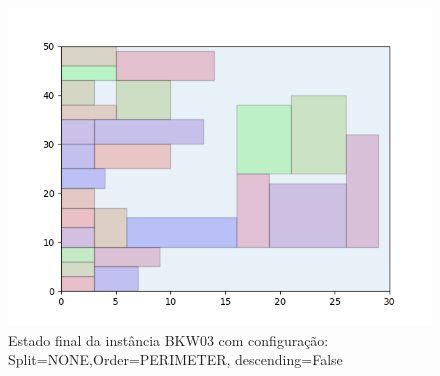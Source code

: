 \begin{figure}[H]
    \centering
    \caption[]{Estado final da instância BKW03 com configuração: Split=NONE,Order=PERIMETER, descending=False}
    \label{fig:bkw03-none-perimeter-false}
    \includegraphics[scale=0.5]{output/figures/bkw/bkw03/none/perimeter/false/00}
\end{figure}